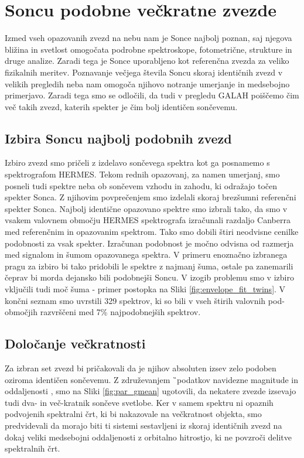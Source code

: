 \section{Soncu podobne večkratne zvezde}
\label{sec:slo_soncevi_veckratniki}
Izmed vseh opazovanih zvezd na nebu nam je Sonce najbolj poznan, saj njegova bližina in svetlost omogočata podrobne spektroskope, fotometrične, strukture in druge analize. Zaradi tega je Sonce uporabljeno kot referenčna zvezda za veliko fizikalnih meritev. Poznavanje večjega števila Soncu skoraj identičnih zvezd v velikih pregledih neba nam omogoča njihovo notranje umerjanje \cite{2010A&A...522A..98M, 2012MNRAS.426..484D} in medsebojno primerjavo. Zaradi tega smo se odločili, da tudi v pregledu GALAH poiščemo čim več takih zvezd, katerih spekter je čim bolj identičen sončevemu.

\subsection{Izbira Soncu najbolj podobnih zvezd}
Izbiro zvezd smo pričeli z izdelavo sončevega spektra kot ga posnamemo s spektrografom HERMES. Tekom rednih opazovanj, za namen umerjanj, smo posneli tudi spektre neba ob sončevem vzhodu in zahodu, ki odražajo točen spekter Sonca. Z njihovim povprečenjem smo izdelali skoraj brezšumni referenčni spekter Sonca. Najbolj identične opazovano spektre smo izbrali tako, da smo v vsakem valovnem območju HERMES spektrografa izračunali razdaljo Canberra \cite{Lance1967MixedDataCP} med referenčnim in opazovanim spektrom. Tako smo dobili štiri neodvisne cenilke podobnosti za vsak spekter. Izračunan podobnost je močno odvisna od razmerja med signalom in šumom opazovanega spektra. V primeru enoznačno izbranega pragu za izbiro bi tako pridobili le spektre z najmanj šuma, ostale pa zanemarili čeprav bi morda dejansko bili podobnejši Soncu. V izogib problemu smo v izbiro vključili tudi moč šuma - primer postopka na Sliki \ref{fig:envelope_fit_twins}. V končni seznam smo uvrstili 329 spektrov, ki so bili v vseh štirih valovnih pod-območjih razvrščeni med 7\% najpodobnejših spektrov.

\subsection{Določanje večkratnosti}
Za izbran set zvezd bi pričakovali da je njihov absoluten izsev zelo podoben oziroma identičen sončevemu. Z združevanjem \G\ podatkov navidezne magnitude in oddaljenosti \cite{2018AJ....156...58B}, smo na Sliki \ref{fig:par_gmean} ugotovili, da nekatere zvezde izsevajo tudi dva- in več-kratnik sončeve svetlobe. Ker v samem spektru ni opaznih podvojenih spektralni črt, ki bi nakazovale na večkratnost objekta, smo predvidevali da morajo biti ti sistemi sestavljeni iz skoraj identičnih zvezd na dokaj veliki medsebojni oddaljenosti z orbitalno hitrostjo, ki ne povzroči delitve spektralnih črt.


